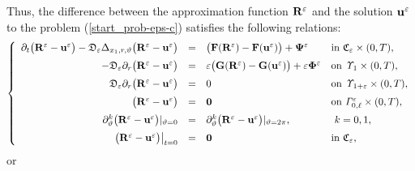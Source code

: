 \documentclass[reqno]{amsart}            %
\numberwithin{equation}{section}
\begin{document}
Thus, the difference between the approximation function ${\bf R}^\varepsilon$ and
the solution ${\bf u}^\varepsilon$ to the problem  (\ref{start_prob-eps-c})  satisfies  the following relations:
\begin{equation*}
\left\{
    \begin{array}{rcll}
    \partial_t \big({\bf R}^\varepsilon - {\bf u}^\varepsilon\big) -
    \mathfrak{D}_\varepsilon \Delta_{x_1,r,\vartheta}\big({\bf R}^\varepsilon - {\bf u}^\varepsilon\big)
     &=& \big({\bf F}({\bf R}^\varepsilon) - {\bf F}({\bf u}^\varepsilon) \big) +
    {\bf \Psi}^\varepsilon
                        &\mbox{in} \ \mathfrak{C}_{\varepsilon}\times (0,T),
                    \\[2mm]
 - \mathfrak{D}_\varepsilon  \partial_{r} \big({\bf R}^\varepsilon - {\bf u}^\varepsilon\big) &=&
 \varepsilon\big({\bf G}({\bf R}^\varepsilon) - {\bf G}({\bf u}^\varepsilon)\big) +
  \varepsilon
 {\bf \Phi}^\varepsilon
                    &\mbox{on} \ {\it \Upsilon}_{1}\times (0,T),
                    \\[2mm]
  \mathfrak{D}_\varepsilon  \partial_{r} \big({\bf R}^\varepsilon - {\bf u}^\varepsilon\big) &=&  0
                    &\mbox{on} \ {\it \Upsilon}_{1+\varepsilon}\times (0,T),
 \\[2mm]
  \big({\bf R}^\varepsilon - {\bf u}^\varepsilon\big) &=& {\bf 0}& \text{on} \  {\it \Gamma}^\varepsilon_{0, \ell}\times (0,T),
 \\[2mm]
   \partial_{\vartheta}^k\big({\bf R}^\varepsilon - {\bf u}^\varepsilon\big)|_{\vartheta=0} &=& \partial_{\vartheta}^k\big({\bf R}^\varepsilon - {\bf u}^\varepsilon\big)|_{\vartheta=2\pi}, & \ k =0, 1,
 \\[2mm]
    \left. \big({\bf R}^\varepsilon - {\bf u}^\varepsilon\big)\right|_{t=0} &=&{\bf 0} &\mbox{in} \   \mathfrak{C}_{\varepsilon},
   \end{array}\right.
\end{equation*}
 or
\end{document}
